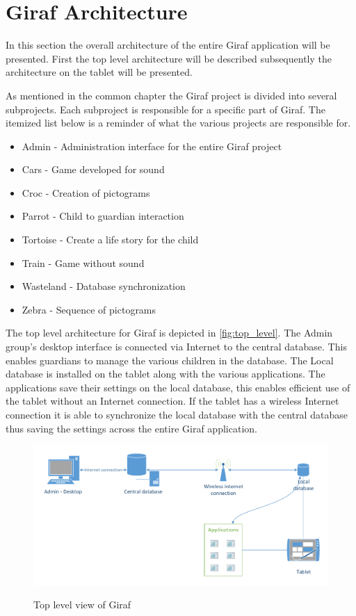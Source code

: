 \section{Giraf Architecture}
In this section the overall architecture of the entire Giraf application will be presented. First the top level architecture will be described subsequently the architecture on the tablet will be presented.

As mentioned in the common chapter  the Giraf project is divided into several subprojects. Each subproject is responsible for a specific part of Giraf. The itemized list below is a reminder of what the various projects are responsible for.

\begin{itemize}
	\item Admin - Administration interface for the entire Giraf project
	\item Cars - Game developed for sound
	\item Croc - Creation of pictograms
	\item Parrot - Child to guardian interaction
	\item Tortoise - Create a life story for the child
	\item Train - Game without sound
	\item Wasteland - Database synchronization
	\item Zebra - Sequence of pictograms
\end{itemize}

The top level architecture for Giraf is depicted in \autoref{fig:top_level}. The Admin group's desktop interface is connected via Internet to the central database. This enables guardians to manage the various children in the database. The Local database is installed on the tablet along with the various applications. The applications save their settings on the local database, this enables efficient use of the tablet without an Internet connection. If the tablet has a wireless Internet connection it is able to synchronize the local database with the central database thus saving the settings across the entire Giraf application. 

\begin{figure}[htpb]
\includegraphics[width=\textwidth]{img/top_level.pdf}
\label{fig:top_level}
\caption{Top level view of Giraf}
\end{figure}

